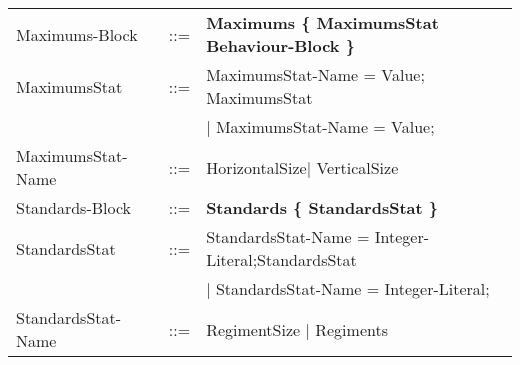 \begin{tabular}{ l l l }
			Maximums-Block	   &	::=	 & \bf{Maximums} \bf{\{} MaximumsStat Behaviour-Block \bf{\}}				\\
			MaximumsStat	   &	::=  & MaximumsStat-Name = Value; MaximumsStat  \\
							   &		 & $\mid$ MaximumsStat-Name = Value;   \\
			MaximumsStat-Name  &	::=  & HorizontalSize$\mid$ VerticalSize					\\
			Standards-Block	   &    ::=  & \bf{Standards} \bf{\{ } StandardsStat \bf{\} }	\\
			StandardsStat	   & 	::=	 & StandardsStat-Name = Integer-Literal;StandardsStat \\
							   &		 & $\mid$ StandardsStat-Name = Integer-Literal; \\
			StandardsStat-Name & 	::=	 & RegimentSize	$\mid$ Regiments \\
		\end{tabular}